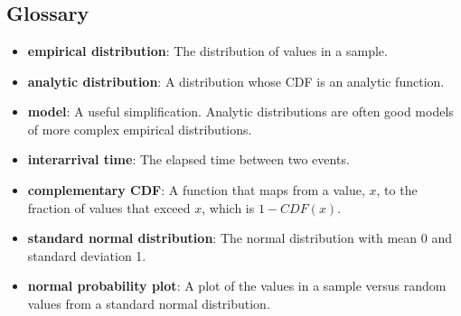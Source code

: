  \chapter{ }  \section*{Glossary} \begin{itemize}
	
	\item {\bf empirical distribution}: The distribution of values in a sample.
	 
	
	\item {\bf analytic distribution}: A distribution whose CDF is an analytic
	function.
	
	\item {\bf model}: A useful simplification.  Analytic distributions are
	often good models of more complex empirical distributions.
	
	\item {\bf interarrival time}: The elapsed time between two events.
	
	\item {\bf complementary CDF}: A function that maps from a value, $x$,
	to the fraction of values that exceed $x$, which is $1 - CDF(x)$.
	  
	
	\item {\bf standard normal distribution}: The normal distribution with
	mean 0 and standard deviation 1.
	
	\item {\bf normal probability plot}: A plot of the values in a sample versus
	random values from a standard normal distribution.
	
\end{itemize}



